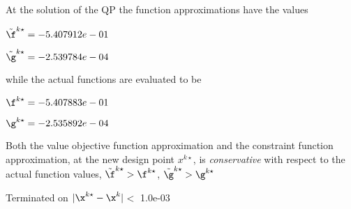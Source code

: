 At the solution of the QP the function approximations have the values

$\tilde \f^{k\star} = -5.407912e-01$

$\tilde \g^{k\star} = -2.539784e-04$

\bigskip
while the actual functions are evaluated to be

$\f^{k\star} = -5.407883e-01$

$\g^{k\star} = -2.535892e-04$

\bigskip 
 Both the value objective function approximation                     and the constraint function approximation, at the new design point                     $x^{k\star}$, is \emph{conservative} with respect to the actual function                     values, $\tilde {\f}^{k\star} > {\f}^{k\star}$,                     $\tilde {\g}^{k\star} > {\g}^{k\star}$ 



\bigskip Terminated on $|\x^{k\star}-\x^{k}|$$<$ 1.0e-03
